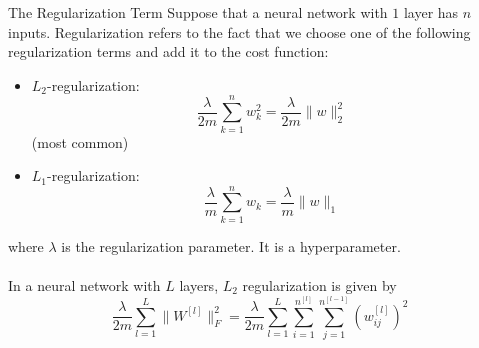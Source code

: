 \documentclass[a4paper]{article}
\begin{document}
\begin{defn}{The Regularization Term}{} Suppose that a neural network with $1$ layer has $n$ inputs. Regularization refers to the fact that we choose one of the following regularization terms and add it to the cost function: 
\begin{itemize}
\item $L_2$-regularization: $$\frac{\lambda}{2m}\sum_{k=1}^n w_k^2=\frac{\lambda}{2m}\|w\|_2^2$$ (most common)
\item $L_1$-regularization: $$\frac{\lambda}{m}\sum_{k=1}^n w_k=\frac{\lambda}{m}\|w\|_1$$
\end{itemize}
where $\lambda$ is the regularization parameter. It is a hyperparameter. \\~\\
In a neural network with $L$ layers, $L_2$ regularization is given by $$\frac{\lambda}{2m}\sum_{l=1}^L\|W^{[l]}\|_F^2=\frac{\lambda}{2m}\sum_{l=1}^L\sum_{i=1}^{n^{[l]}}\sum_{j=1}^{n^{[l-1]}}(w_{ij}^{[l]})^2$$
\end{defn}
\end{document}
